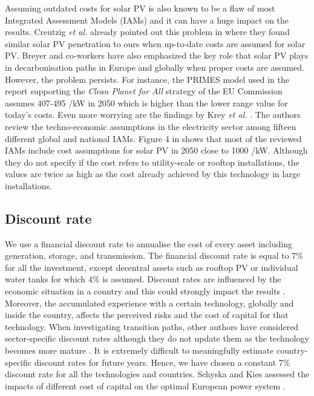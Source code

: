 \documentclass[3p]{elsarticle} %
\begin{document}
Assuming outdated costs for solar PV is also known to be a flaw of most Integrated Assessment Models (IAMs) and it can have a huge impact on the results. Creutzig \textit{et al.} already pointed out this problem in \cite{Creutzig_2017} where they found similar solar PV penetration to ours when up-to-date costs are assumed for solar PV. Breyer and co-workers have also emphasized the key role that solar PV plays in decarbonisation paths in Europe \cite{Child_2019} and globally \cite{Bogdanov_2019} when proper costs are assumed. However, the problem persists. For instance, the PRIMES model used in the report supporting the \textit{Clean Planet for All} strategy of the EU Commission \cite{in-depth_2018} assumes 407-495 \EUR/kW in 2050 \cite{in-depth-data} which is higher than the lower range value for today's costs. Even more worrying are the findings by Krey \textsl{et al.} \cite{Krey_2019}. The authors review the techno-economic assumptions in the electricity sector among fifteen different global and national IAMs. Figure 4 in \cite{Krey_2019} shows that most of the reviewed IAMs include cost assumptions for solar PV in 2050 close to 1000 \EUR/kW. Although they do not specify if the cost refers to utility-scale or rooftop installations, the values are twice as high as the cost already achieved by this technology in large installations. 

\subsection{Discount rate}

We use a financial discount rate to annualise the cost of every asset including generation, storage, and transmission. The financial discount rate is equal to 7\% for all the investment, except decentral assets such as rooftop PV or individual water tanks for which 4\% is assumed. Discount rates are influenced by the economic situation in a country and this could strongly impact the results \cite{Egli_2019}. Moreover, the accumulated experience with a certain technology, globally and inside the country, affects the perceived risks and the cost of capital for that technology. When investigating transition paths, other authors have considered sector-specific discount rates although they do not update them as the technology becomes more mature \cite{in-depth_2018}. It is extremely difficult to meaningfully estimate country-specific discount rates for future years. Hence, we have chosen a constant 7\% discount rate for all the technologies and countries. Schyska and Kies assessed the impacts of different cost of capital on the optimal European power system \cite{Schyska_2020}. \\
\end{document}
